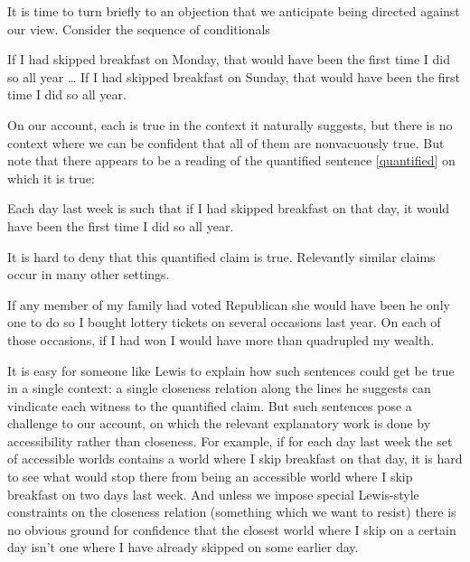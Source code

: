 \documentclass[If.tex]{subfiles}
\begin{document}
\begin{prop}
It is time to turn briefly to an objection that we anticipate being directed against our view. Consider the sequence of conditionals
\begin{prop}
	\nitem 
		\begin{prop}
			\aitem
			If I had skipped breakfast on Monday, that would have been the first time I did so all year 
			\aitem[b] \ldots{} 
			\aitem[g] 
			If I had skipped breakfast on Sunday, that would have been the first time I did so all year.
		\end{prop}
\end{prop}
On our account, each is true in the context it naturally suggests, but there is no context where we can be confident that all of them are nonvacuously true. But note that there appears to be a reading of the quantified sentence \ref{quantified} on which it is true:
\begin{prop}
	\nitem \label{quantified}
		Each day last week is such that if I had skipped breakfast on that day, it would have been the first time I did so all year.
\end{prop}
It is hard to deny that this quantified claim is true. Relevantly similar claims occur in many other settings.
\begin{prop}
	\nitem 
		If any member of my family had voted Republican she would have been he only one to do so
	\nitem 
		I bought lottery tickets on several occasions last year. On each of those occasions, if I had won I would have more than quadrupled my wealth.
\end{prop}
It is easy for someone like Lewis to explain how such sentences could get be true in a single context: a single closeness relation along the lines he suggests can vindicate each witness to the quantified claim. But such sentences pose a challenge to our account, on which the relevant explanatory work is done by accessibility rather than closeness. For example, if for each day last week the set of accessible worlds contains a world where I skip breakfast on that day, it is hard to see what would stop there from being an accessible world where I skip breakfast on two days last week. And unless we impose special Lewis-style constraints on the closeness relation (something which we want to resist) there is no obvious ground for confidence that the closest world where I skip on a certain day isn't one where I have already skipped on some earlier day.


\end{prop}
\end{document}

